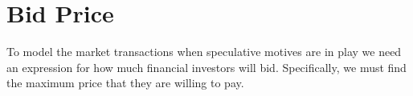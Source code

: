 



\section{Bid Price}\label{sec_model_bid_price}
To model the market transactions when speculative motives are in play we need an expression for how much financial investors will bid. Specifically, we must find the maximum price that they are willing to pay. 


